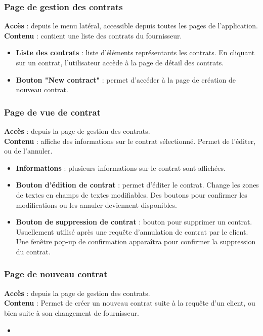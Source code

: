 \documentclass[../rapport.tex]{subfiles}
\begin{document}
\subsubsection{Page de gestion des contrats}
\noindent \textbf{Accès} :  depuis le menu latéral, accessible depuis toutes les pages de l'application.\\
\textbf{Contenu }: contient une liste des contrats du fournisseur. 
\begin{itemize}
    \item \textbf{Liste des contrats} : liste d'éléments représentants les contrats. En cliquant sur un contrat, l'utilisateur accède à la page de détail des contrats.
    \item \textbf{Bouton "New contract"} : permet d'accéder à la page de création de nouveau contrat.
\end{itemize}


\subsubsection{Page de vue de contrat}
\noindent \textbf{Accès} : depuis la page de gestion des contrats. \\
\textbf{Contenu }: affiche des informations sur le contrat sélectionné. Permet de l'éditer, ou de l'annuler.
\begin{itemize} 
    \item \textbf{Informations} : plusieurs informations sur le contrat sont affichées.
    \item \textbf{Bouton d'édition de contrat} : permet d'éditer le contrat. Change les zones de textes en champs de textes modifiables. Des boutons pour confirmer les modifications ou les annuler deviennent disponibles.
    \item \textbf{Bouton de suppression de contrat} : bouton pour supprimer un contrat. Usuellement utilisé après une requête d'annulation de contrat par le client. Une fenêtre pop-up de confirmation apparaîtra pour confirmer la suppression du contrat.
\end{itemize}

\subsubsection{Page de nouveau contrat}
\noindent \textbf{Accès} :  depuis la page de gestion des contrats.\\
\textbf{Contenu }: Permet de créer un nouveau contrat suite à la requête d'un client, ou bien suite à son changement de fournisseur. 
\begin{itemize}
    \item \textbf{}
\end{itemize}
\end{document}
